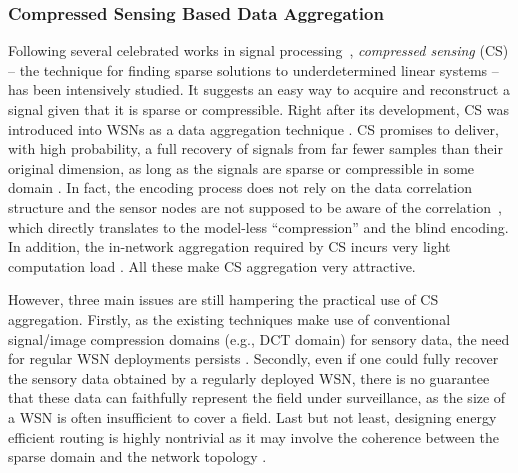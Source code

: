 \documentclass[conference]{IEEEtran}
\begin{document}
    \subsubsection{Compressed Sensing Based Data Aggregation} \label{sec:cda}
Following several celebrated works in signal processing~\cite{CandesRT-TIT06, Donoho-TIT06}, \textit{compressed sensing} (CS) -- the technique for finding sparse solutions to underdetermined linear systems -- has been intensively studied. It suggests an easy way to acquire and reconstruct a signal given that it is sparse or compressible. Right after its development, CS was introduced into WSNs as a data aggregation technique \cite{Haupt-SPMag08,QuerMMRWZ-ITA09,LeePSKO-GSN09,LuoWSC-MobiCom09,LuoXR-ICC10,LeeO-ASC10}. CS promises to deliver, with high probability, a full recovery of signals from far fewer samples than their original dimension, as long as the signals are sparse or compressible in some domain \cite{Candes-SPMag08}. In fact, the encoding process does not rely on the data correlation structure and the sensor nodes are not supposed to be aware of the correlation~\cite{Haupt-SPMag08}, which directly translates to the model-less ``compression'' and the blind encoding. In addition, the in-network aggregation required by CS incurs very light computation load \cite{LuoXR-ICC10}. All these make CS aggregation very attractive.

      However, three main issues are still hampering the practical use of CS aggregation. Firstly, as the existing techniques make use of conventional signal/image compression domains (e.g., DCT domain) for sensory data, the need for regular WSN deployments persists \cite{QuerMMRWZ-ITA09}. Secondly, even if one could fully recover the sensory data obtained by a regularly deployed WSN, there is no guarantee that these data can faithfully represent the field under surveillance, as the size of a WSN is often insufficient to cover a field. Last but not least, designing energy efficient routing is highly nontrivial as it may involve the coherence between the sparse domain and the network topology \cite{LeePSKO-GSN09,LuoXR-ICC10,LeeO-ASC10}.
\end{document}
